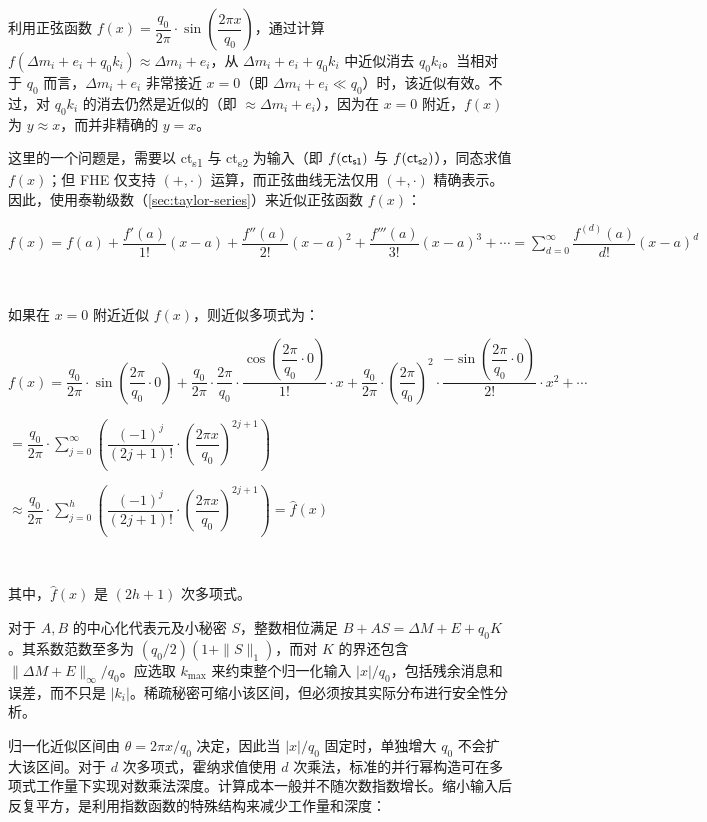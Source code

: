 利用正弦函数 $f(x) = \dfrac{q_0}{2\pi}\cdot \sin\left(\dfrac{2\pi x}{q_0}\right)$，通过计算 $f(\Delta m_i + e_i + q_0k_i) \approx \Delta m_i + e_i$，从 $\Delta m_i + e_i + q_0k_i$ 中近似消去 $q_0k_i$。当相对于 $q_0$ 而言，$\Delta m_i + e_i$ 非常接近 $x=0$（即 $\Delta m_i + e_i \ll q_0$）时，该近似有效。不过，对 $q_0k_i$ 的消去仍然是近似的（即 $\approx \Delta m_i + e_i$），因为在 $x=0$ 附近，$f(x)$ 为 $y \approx x$，而并非精确的 $y = x$。

这里的一个问题是，需要以 \textsf{ct\textsubscript{s1}} 与 \textsf{ct\textsubscript{s2}} 为输入（即 $f(\textsf{ct\textsubscript{s1}})$ 与 $f(\textsf{ct\textsubscript{s2}})$），同态求值 $f(x)$；但 FHE 仅支持 $(+, \cdot)$ 运算，而正弦曲线无法仅用 $(+, \cdot)$ 精确表示。因此，使用泰勒级数（\autoref{sec:taylor-series}）来近似正弦函数 $f(x)$：

$f(x) = f(a) + \dfrac{f'(a)}{1!}(x-a) + \dfrac{f''(a)}{2!}(x-a)^2 + \dfrac{f'''(a)}{3!}(x-a)^3 + \cdots = \sum\limits_{d=0}^{\infty}\dfrac{f^{(d)}(a)}{d!}(x-a)^d$

$ $

如果在 $x = 0$ 附近近似 $f(x)$，则近似多项式为：

$f(x) = \dfrac{q_0}{2\pi}\cdot \sin\left(\dfrac{2\pi}{q_0}\cdot 0\right) + \dfrac{q_0}{2\pi}\cdot\dfrac{2\pi}{q_0}\cdot\dfrac{\cos\left(\dfrac{2\pi}{q_0} \cdot 0\right)}{1!}\cdot x + \dfrac{q_0}{2\pi}\cdot \left(\dfrac{2\pi}{q_0}\right)^{2}\cdot\dfrac{-\sin\left(\dfrac{2\pi}{q_0} \cdot 0\right)}{2!}\cdot x^2 + \cdots$

$ = \dfrac{q_0}{2\pi}\cdot \sum\limits_{j=0}^{\infty}\left(\dfrac{(-1)^j}{(2j + 1)!}\cdot \left(\dfrac{2\pi x}{q_0}\right)^{2j + 1}\right)$

$ \approx \dfrac{q_0}{2\pi}\cdot \sum\limits_{j=0}^{h}\left(\dfrac{(-1)^j}{(2j + 1)!}\cdot \left(\dfrac{2\pi x}{q_0}\right)^{2j + 1}\right) = \hat f(x)$

$ $

其中，$\hat{f}(x)$ 是 $(2h + 1)$ 次多项式。

对于 $A,B$ 的中心化代表元及小秘密 $S$，整数相位满足 $B+AS=\Delta M+E+q_0K$。其系数范数至多为 $(q_0/2)(1+\|S\|_1)$，而对 $K$ 的界还包含 $\|\Delta M+E\|_\infty/q_0$。应选取 $k_{\max}$ 来约束整个归一化输入 $|x|/q_0$，包括残余消息和误差，而不只是 $|k_i|$。稀疏秘密可缩小该区间，但必须按其实际分布进行安全性分析。

归一化近似区间由 $\theta=2\pi x/q_0$ 决定，因此当 $|x|/q_0$ 固定时，单独增大 $q_0$ 不会扩大该区间。对于 $d$ 次多项式，霍纳求值使用 $d$ 次乘法，标准的并行幂构造可在多项式工作量下实现对数乘法深度。计算成本一般并不随次数指数增长。缩小输入后反复平方，是利用指数函数的特殊结构来减少工作量和深度：

